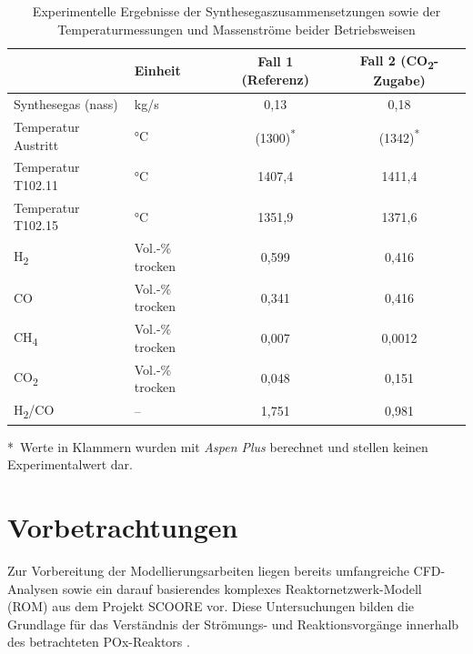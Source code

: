         \begin{table}[H]
            \centering
            \caption{Experimentelle Ergebnisse der Synthesegaszusammensetzungen sowie der Temperaturmessungen und Massenströme beider Betriebsweisen \cite{gonzales}}
            \label{tab:messwerte}
            \begin{tabular}{l l c c}
            \toprule
             & \textbf{Einheit} & \textbf{Fall 1 (Referenz)} & \textbf{Fall 2 (CO\textsubscript{2}-Zugabe)} \\
            \midrule
            Synthesegas (nass) & kg/s & 0{,}13 & 0{,}18 \\
            Temperatur Austritt & °C & (1300)\textsuperscript{*} & (1342)\textsuperscript{*} \\
            Temperatur T102.11 & °C & 1407{,}4 & 1411{,}4 \\
            Temperatur T102.15 & °C & 1351{,}9 & 1371{,}6 \\
            \midrule
            H\textsubscript{2} & Vol.-\% trocken & 0{,}599 & 0{,}416 \\
            CO & Vol.-\% trocken & 0{,}341 & 0{,}416 \\
            CH\textsubscript{4} & Vol.-\% trocken & 0{,}007 & 0{,}0012 \\
            CO\textsubscript{2} & Vol.-\% trocken & 0{,}048 & 0{,}151 \\
            \midrule
            H\textsubscript{2}/CO & – & 1{,}751 & 0{,}981 \\
            \bottomrule
            \end{tabular}
            \footnotesize{*~Werte in Klammern wurden mit \textit{Aspen Plus} berechnet und stellen keinen Experimentalwert dar.}
        \end{table}
    \section{Vorbetrachtungen}
        \label{sec:vorbetrachtungen}
        Zur Vorbereitung der Modellierungsarbeiten liegen bereits umfangreiche CFD-Analysen sowie ein darauf basierendes komplexes Reaktornetzwerk-Modell (ROM) aus dem Projekt SCOORE vor. Diese Untersuchungen bilden die Grundlage für das Verständnis der Strömungs- und Reaktionsvorgänge innerhalb des betrachteten POx-Reaktors \cite{gonzales}. 
        
